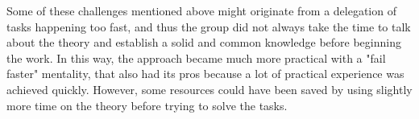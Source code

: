 Some of these challenges mentioned above might originate from a delegation of tasks happening too fast, and thus the group did not always take the time to talk about the theory and establish a solid and common knowledge before beginning the work. In this way, the approach became much more practical with a "fail faster" mentality, that also had its pros because a lot of practical experience was achieved quickly. However, some resources could have been saved by using slightly more time on the theory before trying to solve the tasks.
